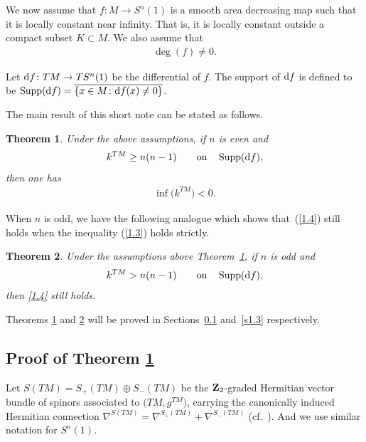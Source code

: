 \documentclass[pdftex]{sigma}
\numberwithin{equation}{section}
\newtheorem{thm}{Theorem}[section]
\theoremstyle{definition}
\begin{document}
We now assume that $f\colon M\rightarrow S^n(1)$ is a smooth area decreasing map such that it is locally constant near infinity. That is, it is locally constant outside a compact subset $K\subset M$. We also assume that
\begin{gather}\label{1.2}
\deg (f)\neq 0.
\end{gather}

Let ${\rm d}f\colon TM\rightarrow TS^n(1)$ be the differential of $f$. The support of ${\rm d}f$ is defined to be $\operatorname{Supp}({\rm d}f)=\overline{\{ x\in M\colon {\rm d}f(x)\neq 0\}}$.

The main result of this short note can be stated as follows.

\begin{thm}\label{t1.1} Under the above assumptions, if $n$ is even and
\begin{gather}\label{1.3}
k^{TM}\geq n(n-1) \qquad {\rm on}\quad \operatorname{Supp}({\rm d}f),
\end{gather}
then one has
\begin{gather}\label{1.4}
\inf \big(k^{TM}\big)<0.
\end{gather}
\end{thm}

When $n$ is odd, we have the following analogue which shows that~(\ref{1.4}) still holds when the inequality (\ref{1.3}) holds strictly.

\begin{thm}\label{t1.2} Under the assumptions above Theorem~{\rm \ref{t1.1}}, if $n$ is odd and
\begin{gather*}%
k^{TM}> n(n-1) \qquad {\rm on}\quad \operatorname{Supp}({\rm d}f),
\end{gather*}
then \eqref{1.4} still holds.
\end{thm}

Theorems \ref{t1.1} and \ref{t1.2} will be proved in Sections~\ref{s1.2} and~\ref{s1.3} respectively.

\subsection{Proof of Theorem \ref{t1.1}}\label{s1.2}

Let $S(TM)=S_+(TM)\oplus S_-(TM)$ be the ${\bf Z}_2$-graded Hermitian vector bundle of spinors associated to $\big(TM,g^{TM}\big)$, carrying the canonically induced Hermitian connection $\nabla^{S(TM)}=\nabla^{S_+(TM)}+\nabla^{S_-(TM)}$ (cf.~\cite{LaMi89}). And we use similar notation for $ S^n(1)$.
\end{document}
